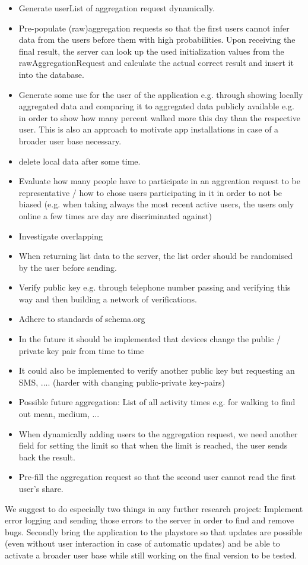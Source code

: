 \begin{itemize}
	\item Generate userList of aggregation request dynamically.
	\item Pre-populate (raw)aggregation requests so that the first users cannot infer data from the users before them with high probabilities. Upon receiving the final result, the server can look up the used initialization values from the rawAggregationRequest and calculate the actual correct result and insert it into the database.
	\item Generate some use for the user of the application e.g. through showing locally aggregated data and comparing it to aggregated data publicly available e.g. in order to show how many percent walked more this day than the respective user. This is also an approach to motivate app installations in case of a broader user base necessary.
	\item delete local data after some time.
	\item Evaluate how many people have to participate in an aggreation request to be representative / how to chose users participating in it in order to not be biased (e.g. when taking always the most recent active users, the users only online a few times are day are discriminated against)
	\item Investigate overlapping
	\item When returning list data to the server, the list order should be randomised by the user before sending.
	\item Verify public key e.g. through telephone number passing and verifying this way and then building a network of verifications.
	\item Adhere to standards of schema.org
	\item In the future it should be implemented that devices change the public / private key pair from time to time
	\item It could also be implemented to verify another public key but requesting an SMS, .... (harder with changing public-private key-pairs)
	\item Possible future aggregation: List of all activity times e.g. for walking to find out mean, medium, ...
	\item When dynamically adding users to the aggregation request, we need another field for setting the limit so that when the limit is reached, the user sends back the result.
	\item Pre-fill the aggregation request so that the second user cannot read the first user's share.
\end{itemize}
We suggest to do especially two things in any further research project: Implement error logging and sending those errors to the server in order to find and remove bugs. Secondly bring the application to the playstore so that updates are possible (even without user interaction in case of automatic updates) and be able to activate a broader user base while still working on the final version to be tested.

